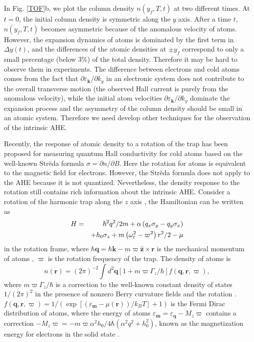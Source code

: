 \documentclass[pra,twocolumn,showpacs,floatfix]{revtex4-1}
\begin{document}
In Fig. \ref{TOF}b, we plot the column density $n\left( y_{f},T,t\right) $
at two different times. At $t=0$, the initial column density is symmetric
along the $y$ axis. After a time $t$, $n\left( y_{f},T,t\right) $ becomes
asymmetric because of the anomalous velocity of atoms. However, the
expansion dynamics of atoms is dominated by the first term in $\Delta
y\left( t\right) $, and the differences of the atomic densities at $\pm
y_{f} $ correspond to only a small percentage (below 3\%) of the total
density. Therefore it may be hard to observe them in experiments. The
difference between electrons and cold atoms comes from the fact that $%
\partial \varepsilon _{\mathbf{k}}/\partial k_{y}$ in an electronic system
does not contribute to the overall transverse motion (the observed Hall
current is purely from the anomalous velocity), while the initial atom
velocities $\partial \varepsilon _{\mathbf{k}}/\partial k_{y}$ dominate the
expansion process and the asymmetry of the column density should be small in
an atomic system. Therefore we need develop other techniques for the
observation of the intrinsic AHE.

Recently, the response of atomic density to a rotation of the trap has been
proposed for measuring quantum Hall conductivity for cold atoms based on the
well-known Str\u{e}da formula \cite{Streda} $\sigma =\partial n/\partial B$.
Here the rotation for atoms is equivalent to the magnetic field for
electrons. However, the Str\u{e}da formula does not apply to the AHE because
it is not quantized. Nevertheless, the density response to the rotation
still contains rich information about the intrinsic AHE. Consider a rotation
of the harmonic trap along the $z$ axis \cite{Haljan}, the Hamiltonian can
be written as
\begin{eqnarray}
H &=&\hbar ^{2}q^{2}/2m+\alpha \left( q_{x}\sigma _{y}-q_{y}\sigma
_{x}\right)  \notag \\
&&+h_{0}\sigma _{z}+m\left( \omega _{t}^{2}-\varpi ^{2}\right) r^{2}/2-\mu
\label{Hamrotation}
\end{eqnarray}%
in the rotation frame, where $\hbar \mathbf{q}=\hbar \mathbf{k}-m\varpi
\mathbf{\hat{z}}\times \mathbf{r}$ is the mechanical momentum of atoms \cite%
{Niu4}, $\varpi $ is the rotation frequency of the trap. The density of
atoms is
\begin{equation}
n\left( \mathbf{r}\right) =\left( 2\pi \right) ^{-2}\int d^{2}\mathbf{q}%
\left[ 1+m\varpi \Gamma _{z}/\hbar \right] f\left( \mathbf{q},\mathbf{r,}%
\varpi \right) ,  \label{density}
\end{equation}%
where $m\varpi \Gamma _{z}/\hbar $ is a correction to the well-known
constant density of states $1/\left( 2\pi \right) ^{2}$ in the presence of
nonzero Berry curvature fields and the rotation \cite{Xiao}. $f\left(
\mathbf{q},\mathbf{r,}\varpi \right) =1/\left( \exp \left[ \left(
\varepsilon _{\mathbf{m}}-\mu \left( \mathbf{r}\right) \right) /k_{B}T\right]
+1\right) $ is the Fermi Dirac distribution of atoms, where the energy of
atoms $\varepsilon _{\mathbf{m}}=\varepsilon _{\mathbf{q}}-M_{z}\varpi $
contains a correction $-M_{z}\varpi =-m\varpi \alpha ^{2}h_{0}/4\hbar \left(
\alpha ^{2}q^{2}+h_{0}^{2}\right) $, known as the magnetization energy for
electrons in the solid state \cite{Niu4}.
\end{document}
